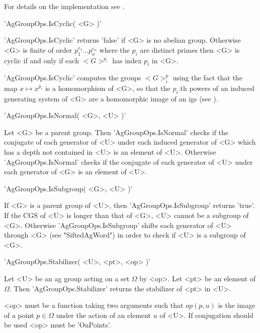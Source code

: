 For details on the implementation see \cite{GS90,CNW90}.


'AgGroupOps.IsCyclic( <G> )'

'AgGroupOps.IsCyclic' returns  'false'  if   <G>  is  no  abelian  group.
Otherwise  <G> is finite  of   order $p_1^{e_1} ... p_n^{e_n}$  where the
$p_i$ are distinct  primes  then <G> is   cyclic if   and only  if   each
$<G>^{p_i}$ has index $p_i$ in <G>.

'AgGroupOps.IsCyclic' computes the  groups $<G>^p_i$  using the fact that
the map  $x \mapsto  x^{p_i}$ is  a homomorphism  of <G>,   so  that  the
$p_i$.th powers of an induced generating system  of <G> are a homomorphic
image of an igs (see \cite{Cel92}).


'AgGroupOps.IsNormal( <G>, <U> )'

Let  <G> be a   parent group.  Then  'AgGroupOps.IsNormal'  checks if the
conjugate of each generator of <U>  under each induced  generator  of <G>
which has a depth not contained in <U>  is an element  of <U>.  Otherwise
'AgGroupOps.IsNormal' checks if  the conjugate of  each generator of  <U>
under each generator of <G> is an element of <U>.


'AgGroupOps.IsSubgroup( <G>, <U> )'

If <G>  is a  parent  group of <U>, then  'AgGroupOps.IsSubgroup' returns
'true'.  If the CGS of <U> is longer than that of <G>, <U>  cannot  be  a
subgroup of <G>.  Otherwise 'AgGroupOps.IsSubgroup' shifts each generator
of <U>  through <G> (see "SiftedAgWord")  in order to check if <U>  is  a
subgroup of <G>.



'AgGroupOps.Stabilizer( <U>, <pt>, <op> )'

Let <U> be an ag group acting on a set $\Omega$ by <op>.   Let <pt> be an
element of $\Omega$.  Then 'AgGroupOps.Stabilizer' returns the stabilizer
of <pt> in <U>.

<op> must be a function taking two  arguments  such that $op( p,  u )$ is
the image of a point $p\in\Omega$  under the action of  an element $u$ of
<U>. If conjugation should be used <op> must be 'OnPoints'.

